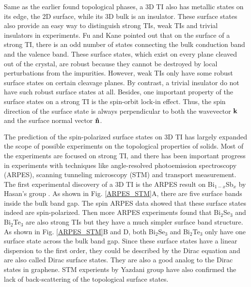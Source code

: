 Same as the earlier found topological phases, a 3D TI also has metallic states on its edge, the 2D surface, while its 3D bulk is an insulator. These surface states also provide an easy way to distinguish strong TIs, weak TIs and trivial insulators in experiments. Fu and Kane pointed out that on the surface of a strong TI, there is an odd number of states connecting the bulk conduction band and the valence band. These surface states, which exist on every plane cleaved out of the crystal, are robust because they cannot be destroyed by local perturbations from the impurities. However, weak TIs only have some robust surface states on certain cleavage planes. By contrast, a trivial insulator do not have such robust surface states at all. Besides, one important property of the surface states on a strong TI is the spin-orbit lock-in effect. Thus, the spin direction of the surface state is always perpendicular to both the wavevector $\bf k$ and the surface normal vector $\bf{\hat{n}}$.

The prediction of the spin-polarized surface states on 3D TI has largely expanded the scope of possible experiments on the topological properties of solids. Most of the experiments are focused on strong TI, and there has been important progress in experiments with techniques like angle-resolved photoemission spectroscopy (ARPES), scanning tunneling microscopy (STM) and transport measurement. The first experimental discovery of a 3D TI is the ARPES result on Bi$_{1-x}$Sb$_x$ by Hasan's group \cite{Hsieh08, Hsieh09}. As shown in Fig. \ref{ARPES_STM}A, there are five surface bands inside the bulk band gap. The spin ARPES data showed that these surface states indeed are spin-polarized. Then more ARPES experiments found that Bi$_2$Se$_3$ and Bi$_2$Te$_3$ \cite{Xia09, Chen09} are also strong TIs but they have a much simpler surface band structure. As shown in Fig. \ref{ARPES_STM}B and D, both Bi$_2$Se$_3$ and Bi$_2$Te$_3$ only have one surface state across the bulk band gap. Since these surface states have a linear dispersion to the first order, they could be described by the Dirac equation and are also called Dirac surface states. They are also a good analog to the Dirac states in graphene. STM experients by Yazdani group\cite{Pedram09} have also confirmed the lack of back-scattering of the topological surface states. 


